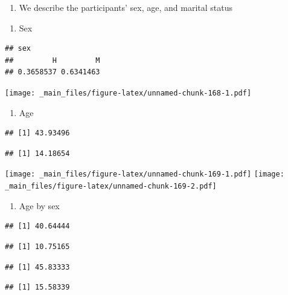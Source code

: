 \documentclass[
]{book}
\providecommand{\tightlist}{%
  \setlength{\itemsep}{0pt}\setlength{\parskip}{0pt}}
\begin{document}
\begin{enumerate}
\def\labelenumi{\arabic{enumi}.}
\tightlist
\item
  We describe the participants' sex, age, and marital status
\end{enumerate}

\begin{enumerate}
\def\labelenumi{\alph{enumi}.}
\tightlist
\item
  Sex
\end{enumerate}

\begin{verbatim}
## sex
##         H         M 
## 0.3658537 0.6341463
\end{verbatim}

\texttt{[image: \_main\_files/figure-latex/unnamed-chunk-168-1.pdf]}

\begin{enumerate}
\def\labelenumi{\alph{enumi}.}
\setcounter{enumi}{1}
\tightlist
\item
  Age
\end{enumerate}

\begin{verbatim}
## [1] 43.93496
\end{verbatim}

\begin{verbatim}
## [1] 14.18654
\end{verbatim}

\texttt{[image: \_main\_files/figure-latex/unnamed-chunk-169-1.pdf]} \texttt{[image: \_main\_files/figure-latex/unnamed-chunk-169-2.pdf]}

\begin{enumerate}
\def\labelenumi{\alph{enumi}.}
\setcounter{enumi}{2}
\tightlist
\item
  Age by sex
\end{enumerate}

\begin{verbatim}
## [1] 40.64444
\end{verbatim}

\begin{verbatim}
## [1] 10.75165
\end{verbatim}

\begin{verbatim}
## [1] 45.83333
\end{verbatim}

\begin{verbatim}
## [1] 15.58339
\end{verbatim}
\end{document}
